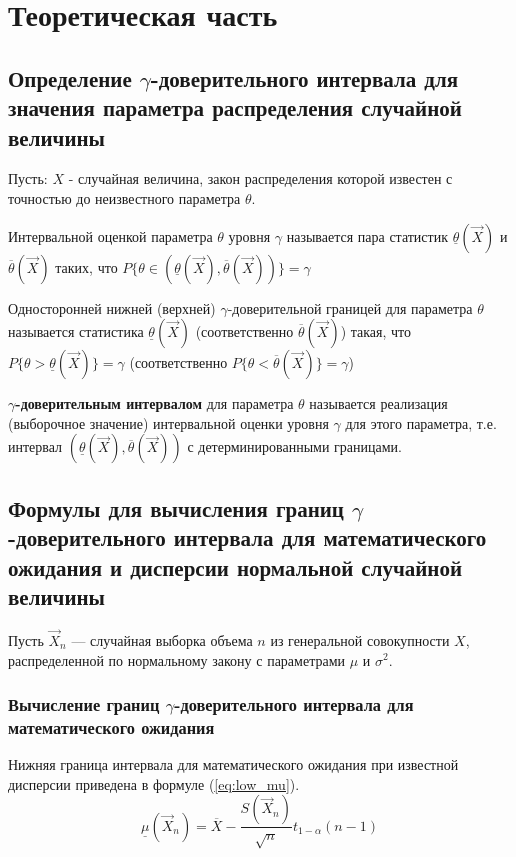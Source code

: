 \chapter{Теоретическая часть}
\section {Определение $\gamma$-доверительного интервала для значения параметра распределения случайной величины}

Пусть: $X$ - случайная величина, закон распределения которой
известен с точностью до неизвестного параметра $\theta$.

Интервальной оценкой параметра $\theta$ уровня $\gamma$ называется пара статистик $\underline\theta(\vec X)$ и $\overline\theta(\vec X)$ таких, что $P\{\theta \in (\underline\theta(\vec X), \overline\theta(\vec X))\} = \gamma$

Односторонней нижней (верхней) $\gamma$-доверительной границей для параметра $\theta$ называется статистика $\underline\theta(\vec X)$ (соответственно $\overline\theta(\vec X)$) такая, что \newline $P\{\theta > \underline\theta(\vec X)\} = \gamma$ (соответственно $P\{\theta < \overline\theta(\vec X)\} = \gamma$)

\textbf{$\gamma$-доверительным интервалом} для параметра $\theta$ называется реализация (выборочное значение) интервальной оценки уровня $\gamma$ для этого параметра, т.е. интервал $(\underline{\theta}(\vec X), \overline{\theta}(\vec X))$ с детерминированными границами.

\section {Формулы для вычисления границ $\gamma$-доверительного интервала для математического ожидания и дисперсии нормальной случайной величины}
\vspace{-0.7cm}
Пусть $\vec{X}_{n}$ — случайная выборка объема $n$ из генеральной совокупности $X$, распределенной по нормальному закону с параметрами $\mu$ и $\sigma^{2}$.
\vspace{-0.7cm}
\subsection{Вычисление границ $\gamma$-доверительного интервала для математического ожидания}
\vspace{-0.7cm}
Нижняя граница интервала для математического ожидания при известной дисперсии приведена в формуле (\ref{eq:low_mu}).
\begin{equation}
	\label{eq:low_mu}
	\underline{\mu}(\vec{X}_{n}) = \overline{X}-\frac{S(\vec{X}_{n})}{\sqrt{n}}t_{1-\alpha}(n-1)
\end{equation}

